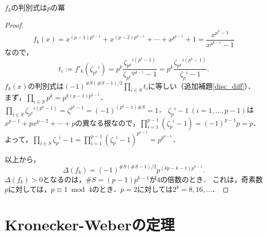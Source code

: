 \begin{screen}
  $f_k$の判別式は$p$の冪
\end{screen}
\begin{proof}
  \[f_k(x)=x^{(p-1)p^{k-1}}+x^{(p-2)p^{k-1}}+\cdots+x^{p^{k-1}}+1=\frac{x^{p^k-1}}{x^{p^{k-1}}-1}\]
  なので，
  \[t_i := f'_k(\zeta_{p^k}{}^i)=p^k\frac{\zeta_{p^k}{}^{i(p^k-1)}}{\zeta_{p^k}{}^{ip^{k-1}}-1}=p^k\frac{\zeta_{p^k}{}^{i(p^k-1)}}{\zeta_p{}^i-1}.\]
  $f_k(x)$の判別式は$(-1)^{\#S(\#S-1)/2}\prod_{i\in S}t_i$に等しい（追加補題\ref{disc_diff}）．
  まず，$\prod_{i\in S}p^k=p^{k(p-1)p^{k-1}}$．
  $\prod_{i\in S}\zeta_{p^k}{}^{i(p^k-1)}=\zeta^{p^k-1}=(-1)^{(p^k-1)\#S}=1$．
  $\zeta_p{}^i-1\ (i=1,\ldots,p-1)$は$x^{p-1}+px^{p-2}+\cdots+p$の異なる根なので，$\prod_{i=1}^{p-1}(\zeta_p{}^i-1)=(-1)^{p-1}p=p$．
  よって，$\prod_{i\in S}\zeta_p{}^i-1=\prod_{i=1}^{p-1}(\zeta_p{}^i-1)^{p^{k-1}}=p^{p^{k-1}}$．

  以上から，
  \[\varDelta(f_k)=(-1)^{\#S(\#S-1)/2}p^{(kp-k-1)p^{k-1}}.\]
  $\varDelta(f_k)>0$となるのは，$\#S=(p-1)p^{k-1}$が$4$の倍数のとき．
  これは，奇素数$p$に対しては，$p\equiv1\bmod4$のとき．$p=2$に対しては$2^k = 8, 16, \ldots$．
\end{proof}

\setcounter{section}{3}
\section{Kronecker-Weberの定理}
